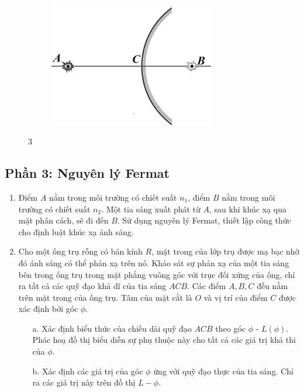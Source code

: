 \begin{figure}
\begin{subfigure}[b]{0.475\textwidth}
    \caption{}
  \end{subfigure}
  \hfill
  \begin{subfigure}[b]{0.475\textwidth}
    \centering
    \includegraphics[width=0.8\textwidth]{Figures/P3/Fig 3.7.png}
    \caption{}
  \end{subfigure}
  \begin{center}
    \figurename{ 3}
  \end{center}
\end{figure}

\subsection*{Phần 3: Nguyên lý Fermat}
\begin{enumerate}
  \item Điểm $A$ nằm trong môi trường có chiết suất $n_{1}$, điểm $B$ nằm trong môi trường có chiết suất $n_{2}$. Một tia sáng xuất phát từ $A$, sau khi khúc xạ qua mặt phân cách, sẽ đi đến $B$. Sử dụng nguyên lý Fermat, thiết lập công thức cho định luật khúc xạ ánh sáng.
  \item Cho một ống trụ rỗng có bán kính $R$, mặt trong của lớp trụ được mạ bạc nhờ đó ánh sáng có thể phản xạ trên nó. Khảo sát sự phản xạ của một tia sáng bên trong ống trụ trong mặt phẳng vuông góc với trục đối xứng của ống, chỉ ra tất cả các quỹ đạo khả dĩ của tia sáng $ACB$. Các điểm $A, B, C$ đều nằm trên mặt trong của ống trụ. Tâm của mặt cắt là $O$ và vị trí của điểm $C$ được xác định bởi góc $\phi$.
        \begin{enumerate}
          \item[a.] Xác định biểu thức của chiều dài quỹ đạo $ACB$ theo góc $\phi$ - $L(\phi)$. Phác hoạ đồ thị biểu diễn sự phụ thuộc này cho tất cả các giá trị khả thi của $\phi$.
          \item[b.] Xác định các giá trị của góc $\phi$ ứng với quỹ đạo thực của tia sáng. Chỉ ra các giá trị này trên đồ thị $L-\phi$.
        \end{enumerate}
\end{enumerate}

